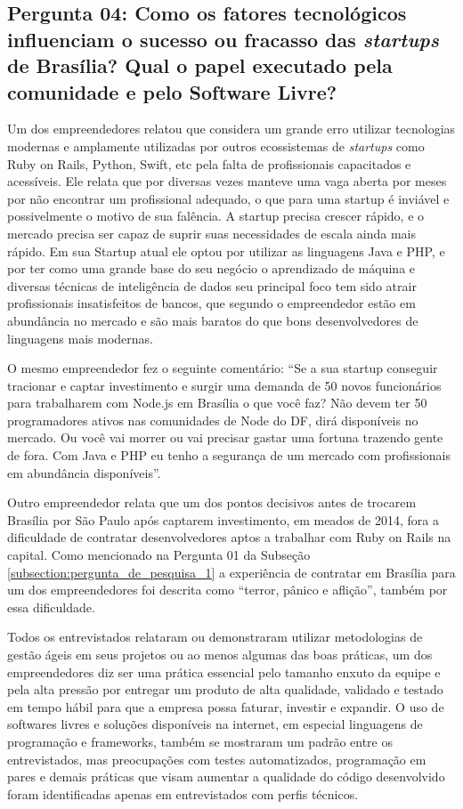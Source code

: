 \subsection*{Pergunta 04: Como os fatores tecnológicos influenciam o sucesso ou fracasso das \textit{startups} de Brasília? Qual o papel executado pela comunidade e pelo Software Livre?}
\label{subsection:pergunta_de_pesquisa_4}

Um dos empreendedores relatou que considera um grande erro utilizar tecnologias modernas e amplamente utilizadas por outros ecossistemas de \textit{startups} como Ruby on Rails, Python, Swift, etc pela falta de profissionais capacitados e acessíveis. Ele relata que por diversas vezes manteve uma vaga aberta por meses por não encontrar um profissional adequado, o que para uma startup é inviável e possivelmente o motivo de sua falência. A startup precisa crescer rápido, e o mercado precisa ser capaz de suprir suas necessidades de escala ainda mais rápido. Em sua Startup atual ele optou por utilizar as linguagens Java e PHP, e por ter como uma grande base do seu negócio o aprendizado de máquina e diversas técnicas de inteligência de dados seu principal foco tem sido atrair profissionais insatisfeitos de bancos, que segundo o empreendedor estão em abundância no mercado e são mais baratos do que bons desenvolvedores de linguagens mais modernas. 

O mesmo empreendedor fez o seguinte comentário: ``Se a sua startup conseguir tracionar e captar investimento e surgir uma demanda de 50 novos funcionários para trabalharem com Node.js em Brasília o que você faz? Não devem ter 50 programadores ativos nas comunidades de Node do DF, dirá disponíveis no mercado. Ou você vai morrer ou vai precisar gastar uma fortuna trazendo gente de fora. Com Java e PHP eu tenho a segurança de um mercado com profissionais em abundância disponíveis''.

Outro empreendedor relata que um dos pontos decisivos antes de trocarem Brasília por São Paulo após captarem investimento, em meados de 2014, fora a dificuldade de contratar desenvolvedores aptos a trabalhar com Ruby on Rails na capital. Como mencionado na Pergunta 01 da Subseção \ref{subsection:pergunta_de_pesquisa_1} a experiência de contratar em Brasília para um dos empreendedores foi descrita como ``terror, pânico e aflição'', também por essa dificuldade.

Todos os entrevistados relataram ou demonstraram utilizar metodologias de gestão ágeis em seus projetos ou ao menos algumas das boas práticas, um dos empreendedores diz ser uma prática essencial pelo tamanho enxuto da equipe e pela alta pressão por entregar um produto de alta qualidade, validado e testado em tempo hábil para que a empresa possa faturar, investir e expandir. O uso de softwares livres e soluções disponíveis na internet, em especial linguagens de programação e frameworks, também se mostraram um padrão entre os entrevistados, mas preocupações com testes automatizados, programação em pares e demais práticas que visam aumentar a qualidade do código desenvolvido foram identificadas apenas em entrevistados com perfis técnicos.

